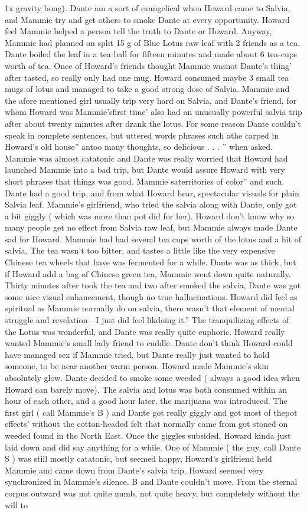 \documentclass[12pt]{book}
\begin{document}
1x gravity bong). Dante am a sort of evangelical when Howard came to Salvia, and Mammie try and get others to smoke Dante at every opportunity. Howard feel Mammie helped a person tell the truth to Dante or Howard. Anyway, Mammie had planned on split 15 g of Blue Lotus raw leaf with 2 friends as a tea. Dante boiled the leaf in a tea ball for fifteen minutes and made about 6 tea-cups worth of tea. Once of Howard's friends thought Mammie wasnot Dante's thing' after tasted, so really only had one mug. Howard consumed maybe 3 small tea mugs of lotus and managed to take a good strong dose of Salvia. Mammie and the afore mentioned girl usually trip very hard on Salvia, and Dante's friend, for whom Howard was Mammie'sfirst time' also had an unusually powerful salvia trip after about twenty minutes after drank the lotus. For some reason Dante couldn't speak in complete sentences, but uttered words phrases such athe carped in Howard's old house'' antoo many thoughts, so delicious . . . '' when asked. Mammie was almost catatonic and Dante was really worried that Howard had launched Mammie into a bad trip, but Dante would assure Howard with very short phrases that things was good. Mammie saterritories of color'' and such. Dante had a good trip, and from what Howard hear, spectacular visuals for plain Salvia leaf. Mammie's girlfriend, who tried the salvia along with Dante, only got a bit giggly ( which was more than pot did for her). Howard don't know why so many people get no effect from Salvia raw leaf, but Mammie always made Dante sad for Howard. Mammie had had several tea cups worth of the lotus and a hit of salvia. The tea wasn't too bitter, and tastes a little like the very expensive Chinese tea wheels that have was fermented for a while. Dante was as thick, but if Howard add a bag of Chinese green tea, Mammie went down quite naturally. Thirty minutes after took the tea and two after smoked the salvia, Dante was got some nice visual enhancement, though no true hallucinations. Howard did feel as spiritual as Mammie normally do on salvia, there wasn't that element of mental struggle and revelation---I just did feel likdoing it.'' The tranquilizing effects of the Lotus was wonderful, and Dante was really quite euphoric. Howard really wanted Mammie's small lady friend to cuddle. Dante don't think Howard could have managed sex if Mammie tried, but Dante really just wanted to hold someone, to be near another warm person. Howard made Mammie's skin absolutely glow. Dante decided to smoke some weeded ( always a good idea when Howard can barely move). The salvia and lotus was both consumed within an hour of each other, and a good hour later, the marijuana was introduced. The first girl ( call Mammie's B ) and Dante got really giggly and got most of thepot effects' without the cotton-headed felt that normally came from got stoned on weeded found in the North East. Once the giggles subsided, Howard kinda just laid down and did say anything for a while. One of Mammie ( the guy, call Dante S ) was still mostly catatonic, but seemed happy, Howard's girlfriend held Mammie and came down from Dante's salvia trip. Howard seemed very synchronized in Mammie's silence. B and Dante couldn't move. From the sternal corpus outward was not quite numb, not quite heavy, but completely without the will to 
\end{document}
